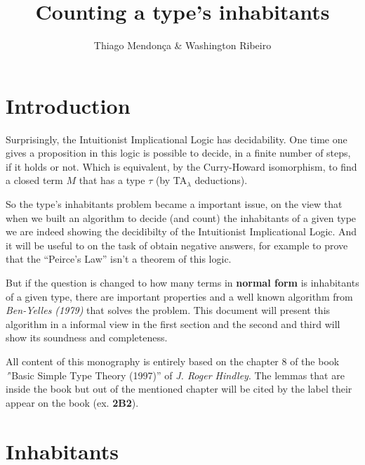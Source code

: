 \documentclass[a4paper,10pt]{article}
\title{Counting a type's inhabitants}
\author{Thiago Mendonça \& Washington Ribeiro}
\begin{document}
\newtheorem{mydef}{Definition}
\newtheorem{notation}{Notation}
\newtheorem{lem}{Lemma}
\newtheorem{theo}{Theorem}
\newtheorem{col}{Colollary}
\newtheorem{com}{Comment}
\newtheorem{exa}{Example}
\newtheorem{note}{Note}
\newtheorem{remark}{Remark}


\maketitle

\tableofcontents

% 



\section{Introduction}


Surprisingly, the Intuitionist 
Implicational Logic has decidability. One time
one gives a proposition in this logic is possible to decide, in a finite number of steps,
if it holds or not. Which is equivalent, by the Curry-Howard isomorphism, 
to find a closed term $M$ that has a type $\tau$ (by TA$_{\lambda}$ deductions).

So the type's inhabitants problem became a important issue, on the view 
that when we built an algorithm to decide (and count) the inhabitants of
a given type we are indeed showing the decidibilty of the Intuitionist 
Implicational Logic.
And it will be useful to on the task of obtain negative answers, for example to
prove that the ``Peirce's Law'' isn't a theorem of this logic.

But if the question is changed to how many terms in \textbf{normal form} is inhabitants of
a given type, there are important properties and a well known algorithm
from {\em Ben-Yelles (1979)} that solves the problem. This document
will present this algorithm in a informal view in the first section 
and the second and third will show its soundness and completeness. 

All content of this monography is entirely based on the chapter 8 of the 
book {\textit ''Basic Simple Type Theory (1997)''} of {\em J. Roger Hindley}.
The lemmas that are inside the book but out of the mentioned chapter
will be cited by the label their appear on the book (ex. \textbf{2B2}).

\section{Inhabitants}
\end{document}
